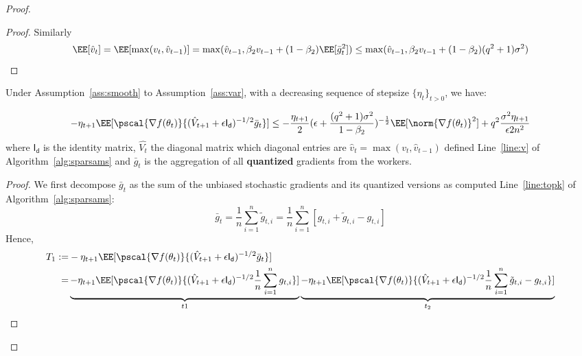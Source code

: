\documentclass[11pt]{article}
\begin{document}
\begin{proof}
\begin{proof}
Similarly
\begin{equation}
\EE[\hat v_t] = \EE[\max(v_t,\hat v_{t-1})] = \max(\hat v_{t-1}, \beta_2 v_{t-1}+(1-\beta_2)\EE[\bar g_t^2]) \leq  \max(\hat v_{t-1}, \beta_2 v_{t-1}+(1-\beta_2)(q^2+1) \sigma^2) 
\end{equation}
\end{proof}

\begin{Lemma}\label{lem:lemma1}
Under Assumption~\ref{ass:smooth} to Assumption~\ref{ass:var}, with a decreasing sequence of stepsize $\{\eta_t\}_{t>0}$, we have:

\begin{equation}
-\eta_{t+1}\EE[\pscal{\nabla f(\theta_t)}{(\hat{V}_{t+1} + \epsilon \mathsf{I_d})^{-1/2} \bar{g}_t}] \leq - \frac{\eta_{t+1}}{2}  (\epsilon + \frac{(q^2+1)\sigma^2}{1 - \beta_2})^{-\frac{1}{2}} \EE[\norm{\nabla f(\theta_t)}^2] +q^2 \frac{\sigma^2 \eta_{t+1}}{\epsilon 2n^2}
\end{equation}
where $ \mathsf{I_d}$ is the identity matrix, $\hat{V_t}$ the diagonal matrix which diagonal entries are $\hat v_t=\max(v_t,\hat v_{t-1})$ defined Line~\ref{line:v} of Algorithm~\ref{alg:sparsams} and $\bar{g}_t$ is the aggregation of all \textbf{quantized} gradients from the workers.
\end{Lemma}



\begin{proof}
We first decompose $\bar{g}_t$  as the sum of the unbiased stochastic gradients and its quantized versions as computed Line~\ref{line:topk} of Algorithm~\ref{alg:sparsams}:
\begin{equation}
\bar{g}_t = \frac{1}{n}\sum_{i=1}^n \tilde g_{t,i} = \frac{1}{n}\sum_{i=1}^n [ g_{t,i} + \tilde g_{t,i} - g_{t,i}]
\end{equation}
Hence,
\begin{equation}
\begin{split}
T_1 := & -\eta_{t+1}\EE[\pscal{\nabla f(\theta_t)}{(\hat{V}_{t+1} + \epsilon \mathsf{I_d})^{-1/2} \bar{g}_t}] \\
=  &\underbrace{ -\eta_{t+1}\EE[\pscal{\nabla f(\theta_t)}{(\hat{V}_{t+1} + \epsilon \mathsf{I_d})^{-1/2} \frac{1}{n}\sum_{i=1}^n  g_{t,i}} ]}_{t1} \underbrace{-\eta_{t+1}\EE[\pscal{\nabla f(\theta_t)}{(\hat{V}_{t+1} + \epsilon \mathsf{I_d})^{-1/2} \frac{1}{n}\sum_{i=1}^n  \tilde g_{t,i} - g_{t,i}}]}_{t_2}
\end{split}
\end{equation}


\end{proof}
\end{proof}
\end{document}
